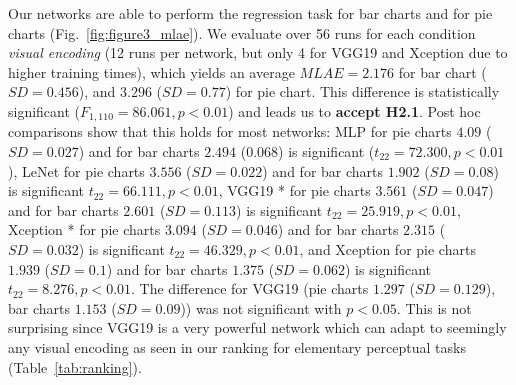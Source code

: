  Our networks are able to perform the regression task for bar charts and for pie charts (Fig.~\ref{fig:figure3_mlae}). We evaluate over 56 runs for each condition \textit{visual encoding} (12 runs per network, but only 4 for VGG19 and Xception due to higher training times), which yields an average $MLAE=2.176$ for bar chart ($SD=0.456$), and $3.296$ ($SD=0.77$) for pie chart. This difference is statistically significant ($F_{1,110}=86.061, p<0.01$) and leads us to \textbf{accept H2.1}. Post hoc comparisons show that this holds for most networks: 
MLP for pie charts $4.09$ ($SD=0.027$) and for bar charts $2.494$ ($0.068$) is significant ($t_{22}=72.300,p<0.01$), 
LeNet for pie charts $ 3.556 $ ($SD= 0.022 $) and for bar charts $ 1.902 $ ($SD= 0.08 $) is significant $t_{22}=66.111, p<0.01$, 
VGG19 *  for pie charts $ 3.561 $ ($SD= 0.047 $) and for bar charts $ 2.601 $ ($SD= 0.113 $) is significant $t_{22}=25.919,p<0.01$, 
Xception * for pie charts  $ 3.094 $ ($SD= 0.046 $) and for bar charts $ 2.315 $ ($SD= 0.032 $) is significant $t_{22}=46.329,p<0.01$, 
and Xception for pie charts $ 1.939 $ ($SD= 0.1 $) and for bar charts $ 1.375 $ ($SD= 0.062 $) is significant $t_{22}=8.276,p<0.01$.
The difference for VGG19 (pie charts $ 1.297 $ ($SD= 0.129 $), bar charts $ 1.153 $ ($SD= 0.09 $)) was not significant with $p<0.05$. This is not surprising since VGG19 is a very powerful network which can adapt to seemingly any visual encoding as seen in our ranking for elementary perceptual tasks (Table~\ref{tab:ranking}).
\\~\\
